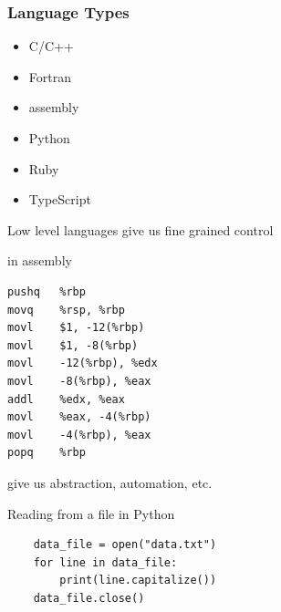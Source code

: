 \begin{frame}
    \frametitle{Language Types}
    
    
    \begin{itemize}
        \item C/C++
        \item Fortran
        \item assembly
    \end{itemize}

    \vspace{1em}


    \begin{itemize}
        \item Python
        \item Ruby
        \item TypeScript
    \end{itemize}

\end{frame}




\begin{frame}[fragile]

    Low level languages give us fine grained control 
    
    \Eg {} in assembly

    {\small
    \begin{verbatim}
pushq   %rbp
movq    %rsp, %rbp
movl    $1, -12(%rbp)
movl    $1, -8(%rbp)
movl    -12(%rbp), %edx
movl    -8(%rbp), %eax
addl    %edx, %eax
movl    %eax, -4(%rbp)
movl    -4(%rbp), %eax
popq    %rbp
    \end{verbatim}
    }



\end{frame}


\begin{frame}
    
     give us abstraction, automation, etc.

\end{frame}



\begin{frame}[fragile]

    \Eg Reading from a file in Python
    
    \begin{verbatim}
    data_file = open("data.txt")
    for line in data_file:
        print(line.capitalize()) 
    data_file.close()
    \end{verbatim}

\end{frame}


